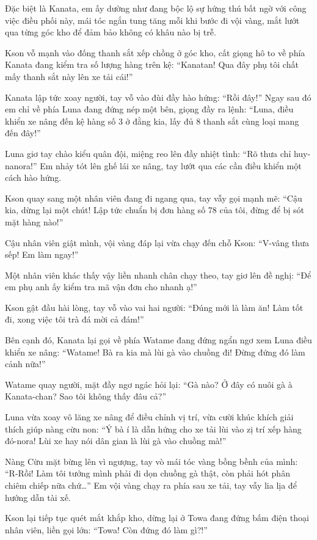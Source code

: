 \documentclass[../main.tex]{subfiles}
\begin{document}
Đặc biệt là Kanata, em ấy dường như đang bộc lộ sự hứng thú bất ngờ với công việc điều phối này, mái tóc ngắn tung tăng mỗi khi bước đi vội vàng, mắt lướt qua từng góc kho để đảm bảo không có khâu nào bị trễ.

Kson vỗ mạnh vào đống thanh sắt xếp chồng ở góc kho, cất giọng hô to về phía Kanata đang kiểm tra số lượng hàng trên kệ: ``Kanatan! Qua đây phụ tôi chất mấy thanh sắt này lên xe tải cái!''

Kanata lập tức xoay người, tay vỗ vào đùi đầy hào hứng: ``Rồi đây!'' Ngay sau đó em chỉ về phía Luna đang đứng nép một bên, giọng đầy ra lệnh: ``Luna, điều khiển xe nâng đến kệ hàng số 3 ở đằng kia, lấy đủ 8 thanh sắt cùng loại mang đến đây!''

Luna giơ tay chào kiểu quân đội, miệng reo lên đầy nhiệt tình: ``Rõ thưa chỉ huy-nanora!'' Em nhảy tót lên ghế lái xe nâng, tay lướt qua các cần điều khiển một cách hào hứng.

Kson quay sang một nhân viên đang đi ngang qua, tay vẫy gọi mạnh mẽ: ``Cậu kia, dừng lại một chút! Lập tức chuẩn bị đơn hàng số 78 của tôi, đừng để bị sót mặt hàng nào!''

Cậu nhân viên giật mình, vội vàng đáp lại vừa chạy đến chỗ Kson: ``V-vâng thưa sếp! Em làm ngay!''

Một nhân viên khác thấy vậy liền nhanh chân chạy theo, tay giơ lên đề nghị: ``Để em phụ anh ấy kiểm tra mã vận đơn cho nhanh ạ!''

Kson gật đầu hài lòng, tay vỗ vào vai hai người: ``Đúng mới là làm ăn! Làm tốt đi, xong việc tôi trà đá mời cả đám!''

Bên cạnh đó, Kanata lại gọi về phía Watame đang đứng ngẩn ngơ xem Luna điều khiển xe nâng: ``Watame! Bà ra kia mà lùi gà vào chuồng đi! Đừng đứng đó làm cảnh nữa!''

Watame quay người, mặt đầy ngơ ngác hỏi lại: ``Gà nào? Ở đây có nuôi gà à Kanata-chan? Sao tôi không thấy đâu cả?''

Luna vừa xoay vô lăng xe nâng để điều chỉnh vị trí, vừa cười khúc khích giải thích giúp nàng cừu non: ``Ý bà í là dẫn hứng cho xe tải lùi vào zị trí xếp hàng đó-nora! Lùi xe hay nói dân gian là lùi gà vào chuồng mà!''

Nàng Cừu mặt bừng lên vì ngượng, tay vò mái tóc vàng bồng bềnh của mình: ``R-Rồi! Làm tôi tưởng mình phải đi dọn chuồng gà thật, còn phải hót phân chiêm chiếp nữa chứ\dots'' Em vội vàng chạy ra phía sau xe tải, tay vẫy lia lịa để hướng dẫn tài xế.

Kson lại tiếp tục quét mắt khắp kho, dừng lại ở Towa đang đứng bấm điện thoại nhân viên, liền gọi lớn: ``Towa! Còn đứng đó làm gì?!''
\end{document}
